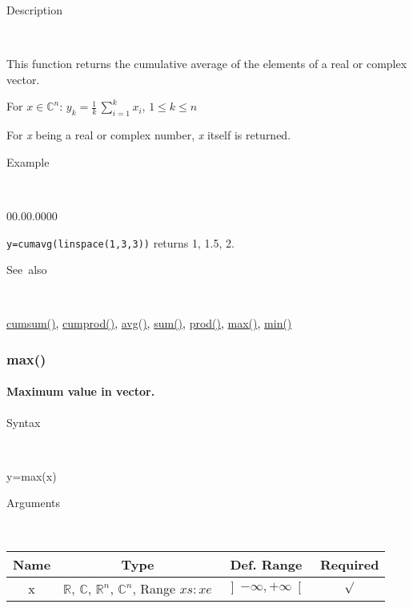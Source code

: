 \begin{description}
\item [Description]~
\end{description}
This function returns the cumulative average of the elements of a
real or complex vector.

\medskip{}
For $x\in$$\mathbb{C}^{n}$: $y_{k}=$${\displaystyle \frac{1}{k}}\,$$\sum\limits _{i=1}^{k}x_{i}$,
$1\leq k\leq n$
\medskip{}

For \textit{x} being a real or complex number, \textit{x} itself is
returned.

\begin{description}
\item [Example]~
\end{description}
\begin{lyxlist}{00.00.0000}
\item [\texttt{y=cumavg(linspace(1,3,3))}]returns 1, 1.5, 2.
\end{lyxlist}
\begin{description}
\item [See~also]~
\end{description}
\textcolor{blue}{\hyperlink{cumsum}{cumsum()}}\textcolor{black}{,}
\textcolor{blue}{\hyperlink{cumprod}{cumprod()}}\textcolor{black}{,}
\textcolor{blue}{\hyperlink{avg}{avg()}}\textcolor{black}{,} \textcolor{blue}{\hyperlink{sum}{sum()}}\textcolor{black}{,}
\textcolor{blue}{\hyperlink{prod}{prod()}}\textcolor{black}{,} \textcolor{blue}{\hyperlink{max}{max()}}\textcolor{black}{,}
\textcolor{blue}{\hyperlink{min}{min()}}


\newpage
\subsubsection*{\hypertarget{max}{}{\Large max()}}


\paragraph{\label{par:Maximum}Maximum value in vector.}

\begin{description}
\item [Syntax]~
\end{description}
y=max(x)

\begin{description}
\item [Arguments]~
\end{description}
\begin{tabular}{|c|c|c|c|}
\hline 
Name&
Type&
Def. Range&
Required\tabularnewline
\hline
\hline 
x&
$\mathbb{R}$, $\mathbb{C}$, $\mathbb{R}^{n}$, $\mathbb{C}^{n}$,
Range $xs:xe$&
$\left]-\infty,+\infty\right[$&
$\surd$\tabularnewline
\hline
\end{tabular}

